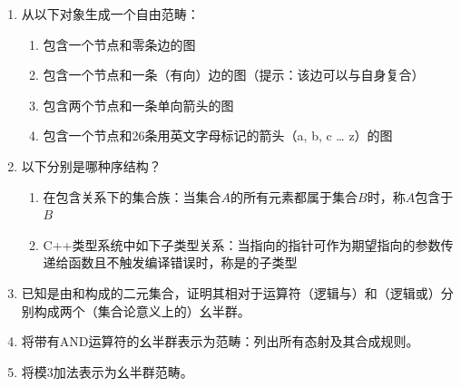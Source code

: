 \begin{enumerate}
  \tightlist
  \item
        从以下对象生成一个自由范畴：

        \begin{enumerate}
          \tightlist
          \item
                包含一个节点和零条边的图
          \item
                包含一个节点和一条（有向）边的图（提示：该边可以与自身复合）
          \item
                包含两个节点和一条单向箭头的图
          \item
                包含一个节点和26条用英文字母标记的箭头（a, b, c \ldots{} z）的图
        \end{enumerate}
  \item
        以下分别是哪种序结构？

        \begin{enumerate}
          \tightlist
          \item
                在包含关系下的集合族：当集合$A$的所有元素都属于集合$B$时，称$A$包含于$B$
          \item
                C++类型系统中如下子类型关系：当指向的指针可作为期望指向的参数传递给函数且不触发编译错误时，称是的子类型
        \end{enumerate}
  \item
        已知是由和构成的二元集合，证明其相对于运算符\code{\&\&}（逻辑与）和\code{||}（逻辑或）分别构成两个（集合论意义上的）幺半群。
  \item
        将带有AND运算符的幺半群表示为范畴：列出所有态射及其合成规则。
  \item
        将模3加法表示为幺半群范畴。
\end{enumerate}